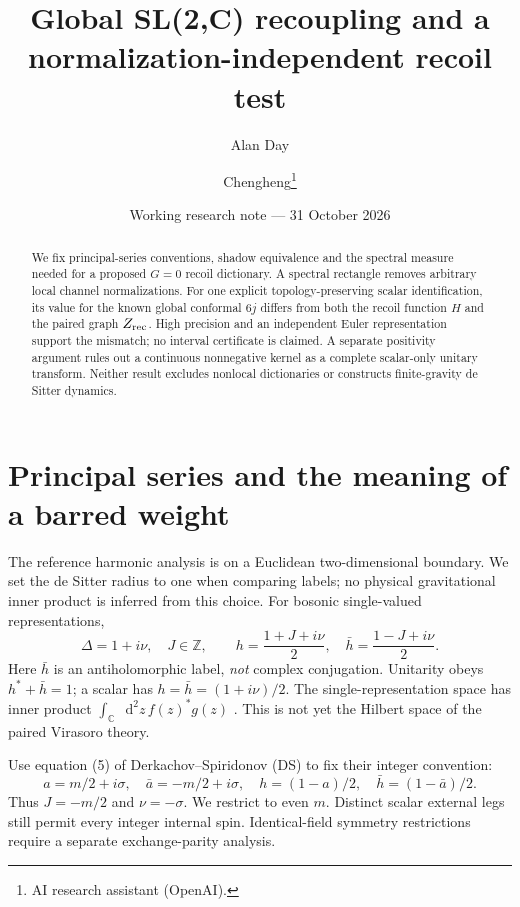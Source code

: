 \documentclass[11pt,a4paper]{article}
\title{Global SL(2,C) recoupling and a\\normalization-independent recoil test}
\author{Alan Day \and Chengheng\thanks{AI research assistant (OpenAI).}}
\date{Working research note --- 31 October 2026}
\newcommand{\dd}{\mathop{}\!\mathrm d}
\newcommand{\C}{\mathbb C}
\begin{document}
\maketitle
\begin{abstract}
We fix principal-series conventions, shadow equivalence and the spectral
measure needed for a proposed $G=0$ recoil dictionary. A spectral rectangle
removes arbitrary local channel normalizations. For one explicit
topology-preserving scalar identification, its value for the known global
conformal $6j$ differs from both the recoil function $H$ and the paired
graph $Z_{\rm rec}$. High precision and an independent Euler representation
support the mismatch; no interval certificate is claimed. A separate
positivity argument rules out a continuous nonnegative kernel as a
complete scalar-only unitary transform. Neither result excludes nonlocal
dictionaries or constructs finite-gravity de Sitter dynamics.
\end{abstract}

\section{Principal series and the meaning of a barred weight}
The reference harmonic analysis is on a Euclidean two-dimensional
boundary. We set the de Sitter radius to one when comparing labels;
no physical gravitational inner product is inferred from this choice.
For bosonic single-valued representations,
\begin{equation}
 \Delta=1+i\nu,\quad J\in\mathbb Z,\qquad
 h=\frac{1+J+i\nu}{2},\quad \bar h=\frac{1-J+i\nu}{2}.
 \label{eq:weights}
\end{equation}
Here $\bar h$ is an antiholomorphic label, \emph{not} complex
conjugation. Unitarity obeys $h^*+\bar h=1$; a scalar has
$h=\bar h=(1+i\nu)/2$. The single-representation space has inner
product $\int_{\C}\dd^2z\,f(z)^*g(z)$ \cite{kks}.
This is not yet the Hilbert space of the paired Virasoro theory.

Use equation (5) of Derkachov--Spiridonov (DS) \cite{ds} to fix
their integer convention:
\begin{equation}
 a=m/2+i\sigma,\quad\bar a=-m/2+i\sigma,\quad
 h=(1-a)/2,\quad\bar h=(1-\bar a)/2.
\end{equation}
Thus $J=-m/2$ and $\nu=-\sigma$. We restrict to even $m$.
Distinct scalar external legs still permit every integer internal
spin. Identical-field symmetry restrictions require a separate
exchange-parity analysis.
\end{document}
